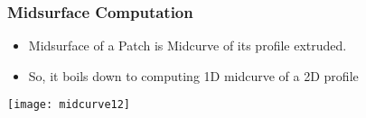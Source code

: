 


	

\begin{frame}[fragile]\frametitle{Midsurface Computation}

	\begin{itemize}
	\item Midsurface of a Patch is Midcurve of its profile extruded.
	\item So, it boils down to computing 1D midcurve of a 2D profile
	\end{itemize}
	
\begin{center}
\texttt{[image: midcurve12]}
\end{center}	
\end{frame}

